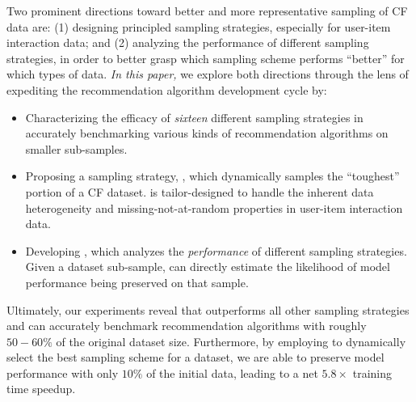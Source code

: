 Two prominent directions toward better and more representative sampling of CF data are: (1) designing principled sampling strategies, especially for user-item interaction data; and (2) analyzing the performance of different sampling strategies, in order to better grasp which sampling scheme performs ``better'' for which types of data. \emph{In this paper,} we explore both directions through the lens of expediting the recommendation algorithm development cycle by:
\begin{itemize}
    \item Characterizing the efficacy of \emph{sixteen} different sampling strategies in accurately benchmarking various kinds of recommendation algorithms on smaller sub-samples.

    \item Proposing a sampling strategy, \sampler, which dynamically samples the ``toughest'' portion of a CF dataset. \sampler is tailor-designed to handle the inherent data heterogeneity and missing-not-at-random properties in user-item interaction data.
    
    \item Developing \oracle, which analyzes the \emph{performance} of different sampling strategies. Given a dataset sub-sample, \oracle can directly estimate the likelihood of model performance being preserved on that sample. 
\end{itemize}
%
Ultimately, our experiments reveal that \sampler outperforms all other sampling strategies and can accurately benchmark recommendation algorithms with roughly $50-60\%$ of the original dataset size. Furthermore, by employing \oracle to dynamically select the best sampling scheme for a dataset, we are able to preserve model performance with only $10\%$ of the initial data, leading to a net $5.8\times$ training time speedup.

